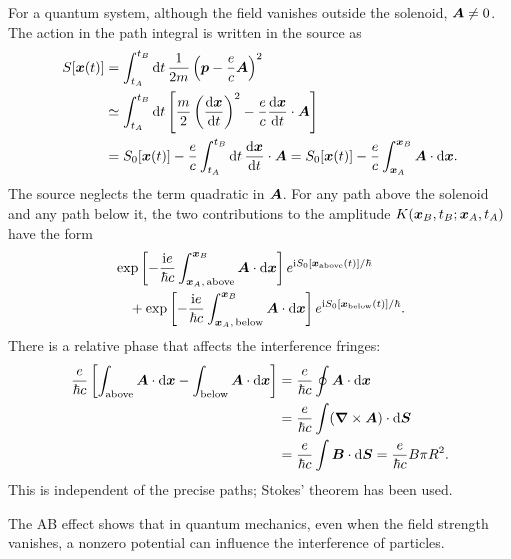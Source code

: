 \begin{center}\end{center}
For a quantum system, although the field vanishes outside the solenoid, $\bm{A}\ne0$. The action in the path integral is written in the source as
\begin{equation}
\begin{split}
S[\bm{x}(t)]
&=\int_{t_A}^{t_B}\mathrm{d} t\,\frac1{2m}\left(\bm{p}-\frac ec\bm{A}\right)^2\\
&\simeq\int_{t_A}^{t_B}\mathrm{d} t\left[
\frac m2\left(\frac{\mathrm{d}\bm{x}}{\mathrm{d} t}\right)^2
-\frac ec\frac{\mathrm{d}\bm{x}}{\mathrm{d} t}\cdot\bm{A}\right]\\
&=S_0[\bm{x}(t)]-\frac ec\int_{t_A}^{t_B}\mathrm{d} t\,
\frac{\mathrm{d}\bm{x}}{\mathrm{d} t}\cdot\bm{A}
=S_0[\bm{x}(t)]-\frac ec\int_{\bm{x}_A}^{\bm{x}_B}\bm{A}\cdot\mathrm{d}\bm{x}.
\end{split}
\end{equation}
The source neglects the term quadratic in $\bm{A}$. For any path above the solenoid and any path below it, the two contributions to the amplitude $K(\bm{x}_B,t_B;\bm{x}_A,t_A)$ have the form
\begin{equation}
\begin{split}
&\exp\left[-\frac{\mathrm{i} e}{\hbar c}\int_{\bm{x}_A,\,\mathrm{above}}^{\bm{x}_B}\bm{A}\cdot\mathrm{d}\bm{x}\right]
 e^{\mathrm{i} S_0[\bm{x}_{\mathrm{above}}(t)]/\hbar}\\
&\quad+\exp\left[-\frac{\mathrm{i} e}{\hbar c}\int_{\bm{x}_A,\,\mathrm{below}}^{\bm{x}_B}\bm{A}\cdot\mathrm{d}\bm{x}\right]
 e^{\mathrm{i} S_0[\bm{x}_{\mathrm{below}}(t)]/\hbar}.
\end{split}
\end{equation}
There is a relative phase that affects the interference fringes:
\begin{equation}
\begin{split}
\frac e{\hbar c}\left[
\int_{\mathrm{above}}\bm{A}\cdot\mathrm{d}\bm{x}
-\int_{\mathrm{below}}\bm{A}\cdot\mathrm{d}\bm{x}\right]
&=\frac e{\hbar c}\oint\bm{A}\cdot\mathrm{d}\bm{x}\\
&=\frac e{\hbar c}\int(\bm{\nabla}\times\bm{A})\cdot\mathrm{d}\bm{S}\\
&=\frac e{\hbar c}\int\bm{B}\cdot\mathrm{d}\bm{S}
=\frac e{\hbar c}B\pi R^2.
\end{split}
\end{equation}
This is independent of the precise paths; Stokes' theorem has been used.

The AB effect shows that in quantum mechanics, even when the field strength vanishes, a nonzero potential can influence the interference of particles.